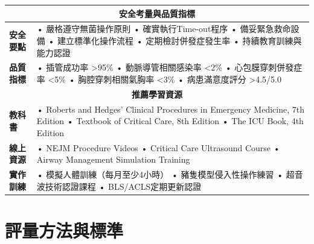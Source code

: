 \documentclass[12pt,a4paper]{article}
\begin{document}
\begin{longtable}{|p{1.5cm}|p{4cm}|p{8.5cm}|}
\multicolumn{3}{|c|}{\textbf{安全考量與品質指標}} \\
\hline
\rowcolor{highlight_yellow}
\textbf{安全要點} & \multicolumn{2}{|p{12.5cm}|}{
• 嚴格遵守無菌操作原則 \newline
• 確實執行Time-out程序 \newline  
• 備妥緊急救命設備 \newline
• 建立標準化操作流程 \newline
• 定期檢討併發症發生率 \newline
• 持續教育訓練與能力認證
} \\
\hline

\textbf{品質指標} & \multicolumn{2}{|p{12.5cm}|}{
• 插管成功率 >95\% \newline
• 動脈導管相關感染率 <2\% \newline
• 心包膜穿刺併發症率 <5\% \newline
• 胸腔穿刺相關氣胸率 <3\% \newline
• 病患滿意度評分 >4.5/5.0
} \\
\hline

\multicolumn{3}{|c|}{\textbf{推薦學習資源}} \\
\hline
\textbf{教科書} & \multicolumn{2}{|p{12.5cm}|}{
• Roberts and Hedges' Clinical Procedures in Emergency Medicine, 7th Edition \newline
• Textbook of Critical Care, 8th Edition \newline
• The ICU Book, 4th Edition
} \\
\hline

\textbf{線上資源} & \multicolumn{2}{|p{12.5cm}|}{
• NEJM Procedure Videos \newline
• Critical Care Ultrasound Course \newline
• Airway Management Simulation Training
} \\
\hline

\textbf{實作訓練} & \multicolumn{2}{|p{12.5cm}|}{
• 模擬人體訓練（每月至少4小時） \newline
• 豬隻模型侵入性操作練習 \newline
• 超音波技術認證課程 \newline
• BLS/ACLS定期更新認證
} \\
\hline

\end{longtable}

\newpage
\section{評量方法與標準}
\end{document}
